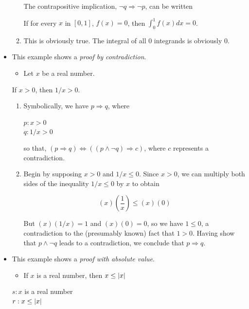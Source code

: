 \documentclass[12pt]{article}
\begin{document}
\begin{itemize}
\begin{enumerate}
The contrapositive implication, \(\neg{}q\Rightarrow{}\neg{}p\), can be written
\begin{center}
If for every \(x\) in \([0,1]\), \(f(x)=0\), then \(\int_{0}^{1}f(x)dx=0\).
\end{center}
\item This is obviously true. The integral of all 0 integrands is obviously 0.
\end{enumerate}
\item This example shows a \emph{proof by contradiction}.
\begin{itemize}
\item Let \(x\) be a real number.
\end{itemize}
\begin{center}
If \(x>0\), then \(1/x>0\).
\end{center}

\begin{enumerate}
\item Symbolically, we have \(p\Rightarrow{}q\), where
\begin{center}
\(p: x>0\) \\
\(q: 1/x>0\) \\
\end{center}

so that, \((p\Rightarrow{}q)\Leftrightarrow{}((p\land{}\neg{}q)\Rightarrow{}c)\), where \(c\) represents a contradiction.
\item Begin by supposing \(x>0\) and \(1/x\le0\). Since \(x>0\), we can multiply both
sides of the inequality \(1/x\le{}0\) by \(x\) to obtain
\begin{center}
$$(x)\left(\frac{1}{x}\right)\le(x)(0)$$
\end{center}

But \((x)(1/x)=1\) and \((x)(0)=0\), so we have \(1\le0\), a contradiction to the
(presumably known) fact that \(1>0\). Having show that \(p\land{}\neg{}q\) leads to a
contradiction, we conclude that \(p\Rightarrow{}q\).
\end{enumerate}
\item This example shows a \emph{proof with absolute value}.
\begin{itemize}
\item If \(x\) is a real number, then \(x\le\left|x\right|\)
\end{itemize}
\begin{center}
\(s: x\) is a real number \\
\(r: x\le\left|x\right|\) \\
\end{center}


\end{itemize}
\end{document}
